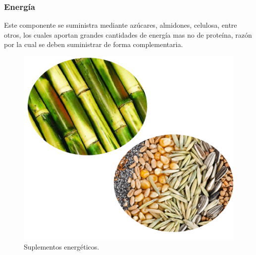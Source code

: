 \subsubsection{Energía}
Este componente se suministra mediante azúcares, almidones, celulosa, entre otros, los cuales aportan grandes cantidades de energía mas no de proteína, razón por la cual se deben suministrar de forma complementaria.
	\begin{figure}[H]
	 \begin{center}
	 \includegraphics[scale=0.5]{img/melazacana.png}
	 \end{center}
	 \caption{Suplementos energéticos. 	\label{energeticospng}}
	\end{figure}
    
